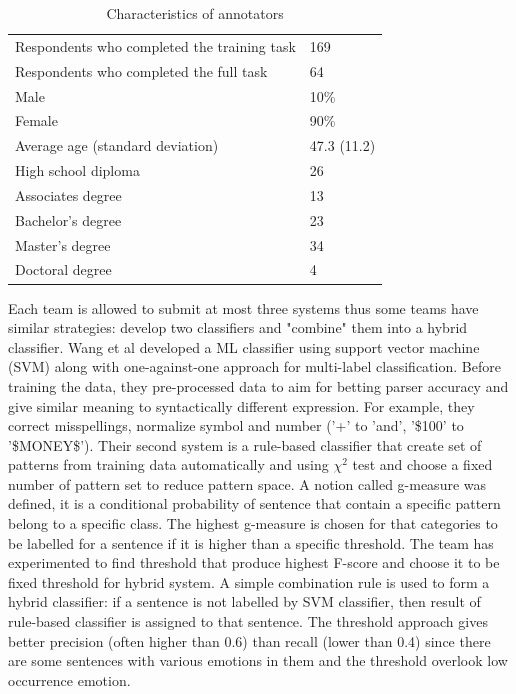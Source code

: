 \begin{table}
\noindent\begin{tabularx}{\textwidth}{ll}
\midrule
Respondents who completed the training task     &    169   \\
Respondents who completed the full task            &     64   \\
Male                                                                       &     10\%   \\
Female                                                                  &     90\%  \\
Average age (standard deviation)                        &    47.3 (11.2)  \\
High school diploma                                              &   26  \\
Associates degree                                               &    13  \\
Bachelor's degree                                                   &    23  \\
Master's degree                                                   &     34  \\
Doctoral degree                                                 &    4  \\
\bottomrule
\end{tabularx}
\caption{Characteristics of annotators}
\label{tab:annotator}
\end{table}
Each team is allowed to submit at most three systems thus some teams have similar strategies: develop two classifiers and "combine" them into a hybrid classifier. Wang et al \cite{Wang2012} developed a ML classifier using support vector machine (SVM) along with one-against-one approach for multi-label classification. Before training the data, they pre-processed data to aim for betting parser accuracy and give similar meaning to syntactically different expression. For example, they correct misspellings, normalize symbol and number (’+’ to ’and’, ’\$100’ to ’\$MONEY\$’). Their second system is a rule-based classifier that create set of patterns from training data automatically and using $\chi^2$ test and choose a fixed number of pattern set to reduce pattern space. A notion called g-measure was defined, it is a conditional probability of sentence that contain a specific pattern belong to a specific class. The highest g-measure is chosen for that categories to be labelled for a sentence if it is higher than a specific threshold. The team has experimented to find threshold that produce highest F-score and choose it to be fixed threshold for hybrid system. A simple combination rule is used to form a hybrid classifier: if a sentence is not labelled by SVM classifier, then result of rule-based classifier is assigned to that sentence. The threshold approach gives better precision (often higher than 0.6) than recall (lower than 0.4) since there are some sentences with various emotions in them and the threshold overlook low occurrence emotion.\\
